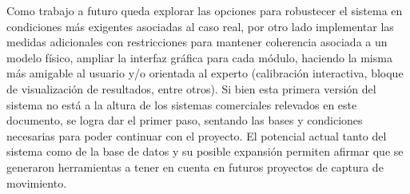 Como trabajo a futuro queda explorar las opciones para robustecer el sistema en condiciones más exigentes asociadas al caso real, por otro lado implementar las medidas adicionales con restricciones para mantener coherencia asociada a un modelo físico, ampliar la interfaz gráfica para cada módulo, haciendo la misma más amigable al usuario y/o orientada al experto (calibración interactiva, bloque de visualización de resultados, entre otros).
Si bien esta primera versión del sistema no está a la altura de los sistemas comerciales relevados en este documento, se logra dar el primer paso, sentando las bases y condiciones necesarias para poder continuar con el proyecto.
El potencial actual tanto del sistema como de la base de datos y su posible expansión permiten afirmar que se generaron herramientas a tener en cuenta en futuros proyectos de captura de movimiento.
